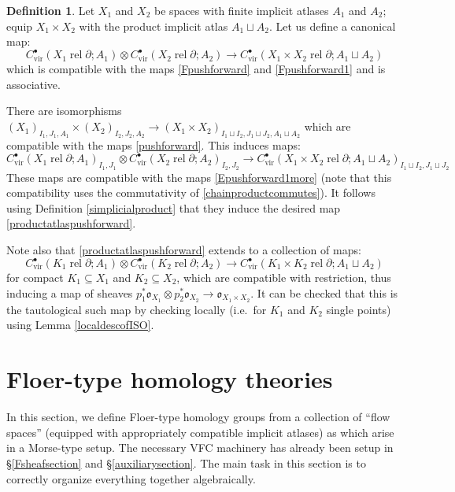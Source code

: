 \documentclass[12pt]{article}
\theoremstyle{definition}
\newtheorem{definition}[theorem]{Definition}
\theoremstyle{remark}
\numberwithin{equation}{subsection}
\newcommand{\oo}{\mathfrak o}
\newcommand{\vir}{\mathrm{vir}}
\newcommand{\rel}{\operatorname{rel}}
\begin{document}
\begin{definition}\label{productatlasF}
Let $X_1$ and $X_2$ be spaces with finite implicit atlases $A_1$ and $A_2$; equip $X_1\times X_2$ with the product implicit atlas $A_1\sqcup A_2$.  Let us define a canonical map:
\begin{equation}\label{productatlaspushforward}
C^\bullet_\vir(X_1\rel\partial;A_1)\otimes C^\bullet_\vir(X_2\rel\partial;A_2)\to C^\bullet_\vir(X_1\times X_2\rel\partial;A_1\sqcup A_2)
\end{equation}
which is compatible with the maps \eqref{Fpushforward} and \eqref{Fpushforward1} and is associative.

There are isomorphisms $(X_1)_{I_1,J_1,A_1}\times(X_2)_{I_2,J_2,A_2}\to(X_1\times X_2)_{I_1\sqcup I_2,J_1\sqcup J_2,A_1\sqcup A_2}$ which are compatible with the maps \eqref{pushforward}.  This induces maps:
\begin{equation}
C^\bullet_\vir(X_1\rel\partial;A_1)_{I_1,J_1}\otimes C^\bullet_\vir(X_2\rel\partial;A_2)_{I_2,J_2}\to C^\bullet_\vir(X_1\times X_2\rel\partial;A_1\sqcup A_2)_{I_1\sqcup I_2,J_1\sqcup J_2}
\end{equation}
These maps are compatible with the maps \eqref{Epushforward1more} (note that this compatibility uses the commutativity of \eqref{chainproductcommutes}).  It follows using Definition \ref{simplicialproduct} that they induce the desired map \eqref{productatlaspushforward}.

Note also that \eqref{productatlaspushforward} extends to a collection of maps:
\begin{equation}\label{productatlaspushforwardonK}
C^\bullet_\vir(K_1\rel\partial;A_1)\otimes C^\bullet_\vir(K_2\rel\partial;A_2)\to C^\bullet_\vir(K_1\times K_2\rel\partial;A_1\sqcup A_2)
\end{equation}
for compact $K_1\subseteq X_1$ and $K_2\subseteq X_2$, which are compatible with restriction, thus inducing a map of sheaves $p_1^\ast\oo_{X_1}\otimes p_2^\ast\oo_{X_2}\to\oo_{X_1\times X_2}$.  It can be checked that this is the tautological such map by checking locally (i.e.\ for $K_1$ and $K_2$ single points) using Lemma \ref{localdescofISO}.
\end{definition}

\section{Floer-type homology theories}\label{homologygroupssection}

In this section, we define Floer-type homology groups from a collection of ``flow spaces'' (equipped with appropriately compatible implicit atlases) as which arise in a Morse-type setup.  The necessary VFC machinery has already been setup in \S\ref{Fsheafsection} and \S\ref{auxiliarysection}.  The main task in this section is to correctly organize everything together algebraically.
\end{document}

